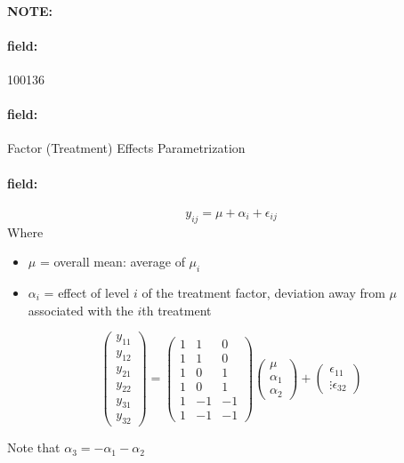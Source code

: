 \documentclass[12pt]{article}
\newenvironment{note}{\paragraph{NOTE:}}{}
\newenvironment{field}{\paragraph{field:}}{}
\begin{document}
\begin{note}
 \begin{field}
  \tiny 100136
 \end{field}
 \begin{field}
  Factor (Treatment) Effects Parametrization
 \end{field}
 \begin{field}
  $$ y_{ij} = \mu + \alpha_i + \epsilon_{ij}$$
  Where
  \begin{itemize}
   \item $\mu$ = overall mean: average of $\mu_i$
   \item $\alpha_i$ = effect of level $i$ of the treatment factor, deviation away from $\mu$ associated with the $i$th treatment
  \end{itemize}

  $$ \begin{pmatrix}
    y_{11} \\ y_{12} \\ y_{21} \\ y_{22} \\ y_{31} \\y_{32}
   \end{pmatrix}  = \begin{pmatrix}
    1 & 1  & 0  \\
    1 & 1  & 0  \\
    1 & 0  & 1  \\
    1 & 0  & 1  \\
    1 & -1 & -1 \\
    1 & -1 & -1
   \end{pmatrix} \begin{pmatrix}
    \mu \\ \alpha_1 \\ \alpha_2
   \end{pmatrix} + \begin{pmatrix}
    \epsilon_{11} \\ \vdots \epsilon_{32}
   \end{pmatrix} $$

  Note that $\alpha_3 = -\alpha_1 - \alpha_2$
 \end{field}
\end{note}
\end{document}
